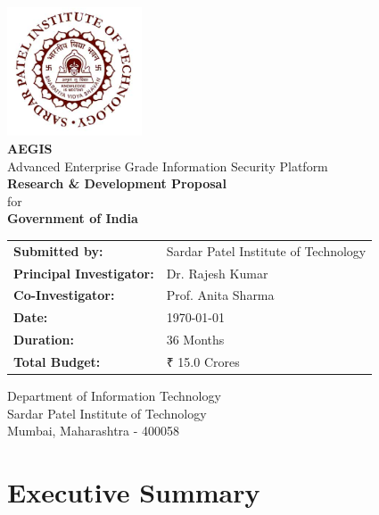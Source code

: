 \documentclass[12pt,a4paper]{article}
\begin{document}
\begin{titlepage}
    \centering
    \vspace*{1cm}
    
    \includegraphics[width=0.3\textwidth]{SPIT_logo.png}\\[1cm]
    
    {\Huge\bfseries\color{titleblue} AEGIS}\\[0.5cm]
    {\Large Advanced Enterprise Grade Information Security Platform}\\[2cm]
    
    {\LARGE\bfseries Research \& Development Proposal}\\[1cm]
    {\large for}\\[0.5cm]
    {\Large\bfseries Government of India}\\[2cm]
    
    \begin{tabular}{ll}
        \textbf{Submitted by:} & Sardar Patel Institute of Technology \\
        \textbf{Principal Investigator:} & Dr. Rajesh Kumar \\
        \textbf{Co-Investigator:} & Prof. Anita Sharma \\
        \textbf{Date:} & \today \\
        \textbf{Duration:} & 36 Months \\
        \textbf{Total Budget:} & ₹ 15.0 Crores
    \end{tabular}
    
    \vfill
    
    {\large Department of Information Technology}\\
    {\large Sardar Patel Institute of Technology}\\
    {\large Mumbai, Maharashtra - 400058}
    
\end{titlepage}

\tableofcontents
\newpage

\section*{Executive Summary}
\end{document}
